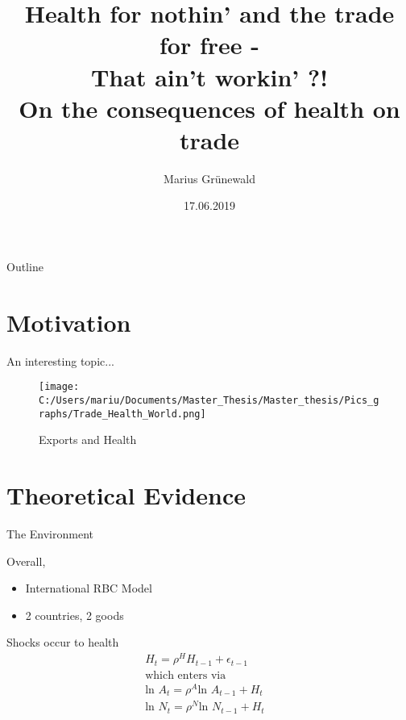 \documentclass[11pt]{beamer}
\title{Health for nothin' and the trade for free - \\ That ain't workin' ?! \\[0.5cm]
On the consequences of health on trade}
\author{Marius Grünewald}
\institute{Copenhagen University}
\date{17.06.2019}
\begin{document}
\begin{frame}[noframenumbering]
  \titlepage
\end{frame}

\begin{frame}{Outline}
  \tableofcontents
  \setcounter{framenumber}{1}
\end{frame}

\section{Motivation}

\begin{frame}{An interesting topic...}
\begin{figure}[!ht]
\begin{center}\caption{Exports and Health \label{Exports and Health}}
\texttt{[image: C:/Users/mariu/Documents/Master\_Thesis/Master\_thesis/Pics\_graphs/Trade\_Health\_World.png]} \\
\end{center}
\end{figure}
\end{frame}


\section{Theoretical Evidence}


\begin{frame}{The Environment}

Overall,
\begin{itemize}
\item International RBC Model \\ 
\item 2 countries, 2 goods \\
\end{itemize}

Shocks occur to health
\begin{align}
H_{t} = \rho^H H_{t-1} + \epsilon_{t-1} \\ \text{which enters via}& \nonumber \\
\text{ln } A_{t} = \rho^A \text{ln } A_{t-1} + H_{t} \\
\text{ln } N_{t} = \rho^N \text{ln } N_{t-1} + H_{t}
\end{align}

\end{frame}
\end{document}
